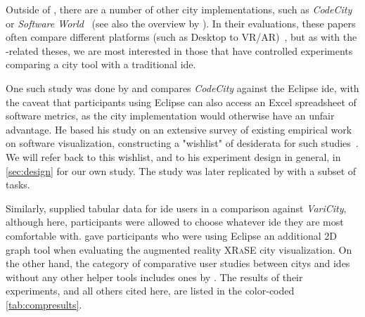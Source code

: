 \documentclass[../thesis]{subfiles}
\begin{document}
Outside of \SEE{}, there are a number of other \gls{city} implementations, such as \emph{CodeCity}~\cite{wettel2007} or \emph{Software World}~\cite{knight2000} (see also the overview by \textcite{jeffery2019}).
In their evaluations, these papers often compare different platforms (such as Desktop to VR/AR)~\cite[\eg,][]{merino2017,fittkau2015, merino2018}, but as with the \SEE{}-related theses, we are most interested in those that have controlled experiments comparing a \gls{city} tool with a traditional \gls{ide}.

One such study was done by \textcite{wettel2011} and compares \emph{CodeCity} against the Eclipse \gls{ide}, with the caveat that participants using Eclipse can also access an Excel spreadsheet of software metrics, as the \gls{city} implementation would otherwise have an unfair advantage.
He based his study on an extensive survey of existing empirical work on software visualization, constructing a "wishlist" of desiderata for such studies~\cite[chapter 7]{wettel2011}.
We will refer back to this wishlist, and to his experiment design in general, in \cref{sec:design} for our own study.
The study was later replicated by \textcite{romano2019} with a subset of tasks.

Similarly, \textcite{mortara2024} supplied tabular data for \gls{ide} users in a comparison against \emph{VariCity}, although here, participants were allowed to choose whatever \gls{ide} they are most comfortable with.
\textcite{mehra2020} gave participants who were using Eclipse an additional 2D graph tool when evaluating the augmented reality \textsc{XRaSE} \gls{city} visualization.
On the other hand, the category of comparative user studies between \glspl{city} and \glspl{ide} without any other helper tools includes ones by \textcite{khaloo2017,galperin2022,lennartkipka2020}.
The results of their experiments, and all others cited here, are listed in the color-coded \cref{tab:compresults}.



\newcommand{\reside}[1]{\cellcolor{Blue}\textcolor{White}{#1}}
\newcommand{\rescc}[1]{\cellcolor{Maroon}\textcolor{White}{#1}}
\newcommand{\residel}[1]{\cellcolor{LightBlue}#1}  %
\newcommand{\resccl}[1]{\cellcolor{LightMaroon}#1}
\newcommand{\resmixed}[1]{\cellcolor{Goldenrod}#1}  %
\newcommand{\resnone}[1]{\cellcolor{Gray!70!white}No diff.}  %
\newcommand{\resna}[1]{\textcolor{Gray}{\textit{N/A}}}
\end{document}
